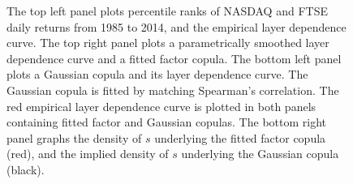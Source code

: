 \documentclass[authoryear]{elsarticle}
\newcommand{\eps}{\epsilon}
\newcommand{\E}{{\mathrm E}}
\newcommand{\de}{\mathrm{d}}
\newcommand{\cq}{\ ,\quad }
\newcommand{\eref}[1]{(\ref{#1})}
\begin{document}
\begin{figure}
\begin{center}
    \caption{The top left panel plots percentile ranks of NASDAQ and FTSE daily returns from 1985 to 2014, and the empirical layer dependence curve. The top right panel plots a parametrically smoothed layer dependence curve and a fitted factor copula. The bottom left panel plots a Gaussian copula and its layer dependence curve. The Gaussian copula is fitted by matching Spearman's correlation. The red empirical layer dependence curve is plotted in both panels containing fitted factor and Gaussian copulas. The bottom right panel graphs the density of $s$ underlying the fitted factor copula (red), and the implied density of $s$ underlying the Gaussian copula (black).}
    \label{fmarketindex}
  \end{center}
\end{figure}

\end{document}
